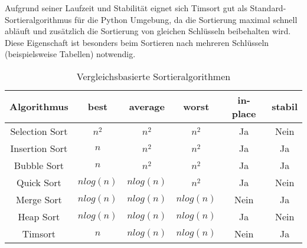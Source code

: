 \begin{description}
Aufgrund seiner Laufzeit und Stabilität eignet sich Timsort gut als Standard-Sortieralgorithmus für die Python Umgebung, da die Sortierung maximal schnell abläuft und zusätzlich die Sortierung von gleichen Schlüsseln beibehalten wird. Diese Eigenschaft ist besonders beim Sortieren nach mehreren Schlüsseln (beispielsweise Tabellen) notwendig.
\begin{table}[H]
\centering
\begin{tabular}{|c|c|c|c|c|c|}
\hline
Algorithmus & best & average & worst & in-place & stabil \\ \hline
Selection Sort & $n^2$ & $n^2$ & $n^2$ & Ja & Nein \\ \hline
Insertion Sort & $n$ &$ n^2$ &$ n^2$ & Ja & Ja \\ \hline
Bubble Sort & $n$ & $n^2$ & $n^2$ & Ja & Ja \\ \hline
Quick Sort & $n log(n)$ & $n log(n)$ & $n^2$ & Ja & Nein \\ \hline
Merge Sort & $n log(n)$ & $n log(n)$ & $n log(n)$ & Nein & Ja \\ \hline
Heap Sort & $n log(n)$ & $n log(n)$ & $n log(n)$ & Ja & Nein \\ \hline
Timsort & $n$ & $n log(n)$ & $n log(n)$ & Nein & Ja \\ \hline
\end{tabular}
\caption{Vergleichsbasierte Sortieralgorithmen}
\end{table}
\end{description}







